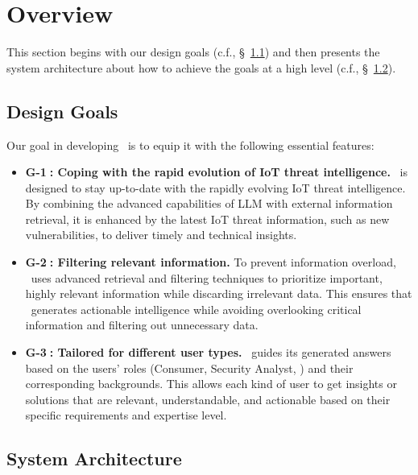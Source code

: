 


\section{Overview}\label{sec:overgoal}
This section begins with our design goals (c.f., \S~\ref{sec:goal}) and then presents the system architecture about how to achieve the goals at a high level (c.f., \S~\ref{sec:overview}).


\subsection{Design Goals}\label{sec:goal}
Our goal in developing \chatiot\ is to equip it with the following essential features:

\begin{itemize}
\item\textbf{G-\textcircled{1}: Coping with the rapid evolution of IoT threat intelligence.}
\chatiot\ is designed to stay up-to-date with the rapidly evolving IoT threat intelligence.
By combining the advanced capabilities of LLM with external information retrieval, it is enhanced by the latest IoT threat information, such as new vulnerabilities, to deliver timely and technical insights.

\item \textbf{G-\textcircled{2}: Filtering relevant information.}
To prevent information overload, \chatiot\ uses advanced retrieval and filtering techniques to prioritize important, highly relevant information while discarding irrelevant data. This ensures that \chatiot\ generates actionable intelligence while avoiding overlooking critical information and filtering out unnecessary data.

\item \textbf{G-\textcircled{3}: Tailored for different user types.}
\chatiot\ guides its generated answers based on the users' roles (Consumer, Security Analyst, \etc) and their corresponding backgrounds.
This allows each kind of user to get insights or solutions that are relevant, understandable, and actionable based on their specific requirements and expertise level.
\end{itemize}





\subsection{System Architecture}\label{sec:overview}

